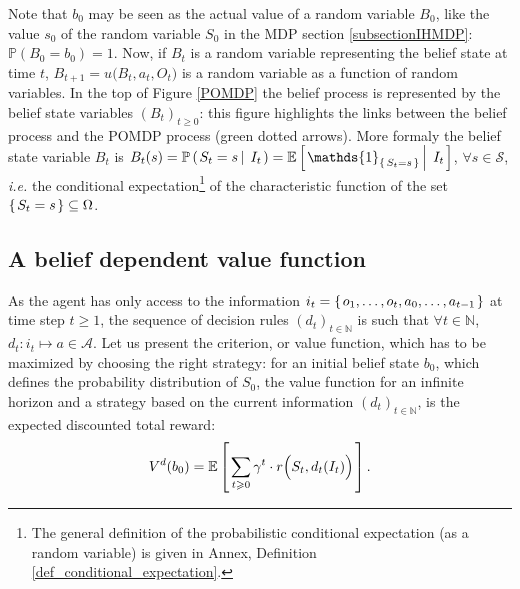 Note that $b_0$ may be seen as the actual value 
of a random variable $B_0$, like the value $s_0$ of the random variable $S_0$
in the MDP section \ref{subsectionIHMDP}: $\mathbb{P}(B_0 = b_0) = 1$. 
Now, if $B_t$ is a random variable representing the belief state at time $t$,
$B_{t+1} = u\Big(B_t,a_t,O_t\Big)$ is a random variable as a function of random variables.
In the top of Figure \ref{POMDP} the belief process is represented by the belief state variables $(B_t)_{t\geqslant0}$:
this figure highlights the links between the belief process and the POMDP process (green dotted arrows).
More formaly the belief state variable $B_t$ is
$B_t(s) = \mathbb{P} \paren{ S_t = s \sachant I_t } = \mathbb{E} \croch{ \mathds{1}_{\set{S_{t}=s}} \sachant I_t }$,
$\forall s \in \mathcal{S}$, 
\textit{i.e.} the conditional expectation\footnote{The general definition 
of the probabilistic conditional expectation 
(as a random variable) is given in Annex, 
Definition \ref{def_conditional_expectation}.}
of the characteristic function of the set $\left\{ \left.  S_t = s  \right. \right\} \subseteq \Omega$.

\subsection{A belief dependent value function}
\label{section_abeldepvalfunc}
As the agent has only access to the information $i_t = \left\{ \left. o_1,\ldots,o_t,a_0,\ldots,a_{t-1} \right. \right\}$ 
at time step $t \geqslant 1$,
the sequence of decision rules 
$(d_t)_{t \in \mathbb{N}}$ 
is such that $\forall t \in \mathbb{N}$, 
$d_t: i_t \mapsto a \in \mathcal{A}$.
Let us present the criterion, or value function, 
which has to be maximized by choosing the right strategy:
for an initial belief state $b_0$, 
which defines the probability distribution of $S_0$,
the value function for an infinite horizon
and a strategy based on the current information $(d_t)_{t\in\mathbb{N}}$, 
is the expected discounted total reward:
\begin{equation}
 V^d(b_0) = \mathbb{E} \left[ \left.  \sum_{ t \geqslant 0} \gamma^t \cdot r\Big(S_t,d_t(I_t)\Big)  \right. \right].
\label{pomdp_value}
\end{equation}

